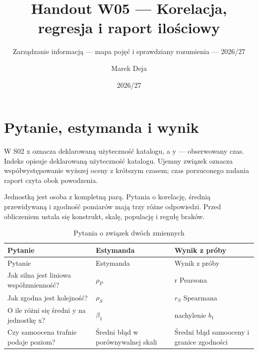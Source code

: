 \documentclass[
  polish,
  11pt,
  a4paper,
]{article}
\title{Handout W05 --- Korelacja, regresja i raport ilościowy}
\subtitle{Zarządzanie informacją --- mapa pojęć i sprawdziany rozumienia
--- 2026/27}
\author{Marek Deja}
\date{2026/27}
\begin{document}
\maketitle

\section{Pytanie, estymanda i wynik}\label{pytanie-estymanda-i-wynik}

W S02 x oznacza deklarowaną użyteczność katalogu, a y --- obserwowany
czas. Indeks opisuje deklarowaną użyteczność katalogu. Ujemny związek
oznacza współwystępowanie wyższej oceny z krótszym czasem; czas
porzuconego zadania raport czyta obok powodzenia.

Jednostką jest osoba z kompletną parą. Pytania o korelację, średnią
przewidywaną i zgodność pomiarów mają trzy różne odpowiedzi. Przed
obliczeniem ustala się konstrukt, skalę, populację i regułę braków.

\begin{longtable}[]{@{}
  >{\raggedright\arraybackslash}p{}
  >{\raggedright\arraybackslash}p{}
  >{\raggedright\arraybackslash}p{}@{}}
\caption{Pytania o związek dwóch zmiennych}\tabularnewline
\toprule\noalign{}
\begin{minipage}[b]{\linewidth}\raggedright
Pytanie
\end{minipage} & \begin{minipage}[b]{\linewidth}\raggedright
Estymanda
\end{minipage} & \begin{minipage}[b]{\linewidth}\raggedright
Wynik z próby
\end{minipage} \\
\midrule\noalign{}
\endfirsthead
\toprule\noalign{}
\begin{minipage}[b]{\linewidth}\raggedright
Pytanie
\end{minipage} & \begin{minipage}[b]{\linewidth}\raggedright
Estymanda
\end{minipage} & \begin{minipage}[b]{\linewidth}\raggedright
Wynik z próby
\end{minipage} \\
\midrule\noalign{}
\endhead
\bottomrule\noalign{}
\endlastfoot
Jak silna jest liniowa współzmienność? & \(\rho_P\) & r Pearsona \\
Jak zgodna jest kolejność? & \(\rho_S\) & \(r_S\) Spearmana \\
O ile różni się średni y na jednostkę x? & \(\beta_1\) & nachylenie
\(b_1\) \\
Czy samoocena trafnie podaje poziom? & Średni błąd w porównywalnej skali
& Średni błąd samooceny i granice zgodności \\
\end{longtable}
\end{document}
